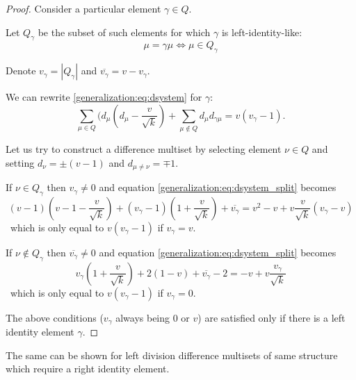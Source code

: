     \begin{proof}
        Consider a particular element $\gamma \in Q$. 
        
        Let $Q_\gamma$ be the subset of such elements for which $\gamma$ is left-identity-like:
        \begin{equation}
            \mu=\gamma\mu \iff \mu \in Q_\gamma
        \end{equation}

        Denote $v_\gamma = |Q_\gamma|$ and $\overline{v_\gamma} = v - v_\gamma$.
        
        We can rewrite \eqref{generalization:eq:dsystem} for $\gamma$:
        \begin{equation}
            \label{generalization:eq:dsystem_split}
            \sum\limits_{\mu \in Q} (d_\mu (d_\mu-\frac v {\sqrt k})
            + \sum\limits_{\mu \notin Q} d_\mu d_{\gamma\mu}
             = v(v_\gamma - 1).
        \end{equation}

        Let us try to construct a difference multiset by selecting element $\nu \in Q$ and setting $d_\nu=\pm(v-1)$ and $d_{\mu\neq\nu}=\mp 1$.
        
        If $\nu \in Q_\gamma$ then $v_\gamma \neq 0$ and equation \eqref{generalization:eq:dsystem_split} becomes
        \begin{equation}
            (v-1)(v-1-\frac v {\sqrt k}) 
             + (v_\gamma - 1)(1 + \frac v {\sqrt k})
             + \overline{v_\gamma}
            = v^2 - v + v \frac v {\sqrt k} (v_\gamma-v)
        \end{equation}\
        which is only equal to $v(v_\gamma - 1)$ if $v_\gamma=v$.
        
        If $\nu \notin Q_\gamma$ then $\overline{v_\gamma} \neq 0$ and equation \eqref{generalization:eq:dsystem_split} becomes
        \begin{equation}
            v_\gamma (1 + \frac v {\sqrt k})
             + 2 (1 - v)
             + \overline{v_\gamma} - 2
            = -v + v \frac {v_\gamma} {\sqrt k}
        \end{equation}\
        which is only equal to $v(v_\gamma - 1)$ if $v_\gamma=0$.
        
        The above conditions ($v_\gamma$ always being $0$ or $v$) are satisfied only if there is a left identity element $\gamma$.
    \end{proof}

    The same can be shown for left division difference multisets of same structure which require a right identity element.

